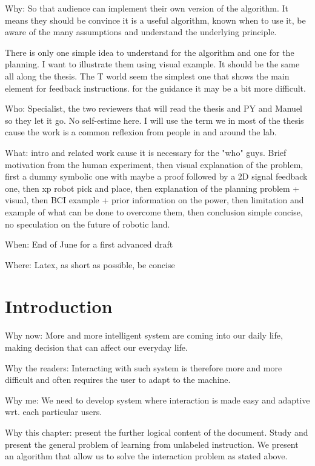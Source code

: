 
Why: So that audience can implement their own version of the algorithm. It means they should be convince it is a useful algorithm, known when to use it, be aware of the many assumptions and understand the underlying principle. 

There is only one simple idea to understand for the algorithm and one for the planning. I want to illustrate them using visual example. It should be the same all along the thesis. The T world seem the simplest one that shows the main element for feedback instructions. for the guidance it may be a bit more difficult.

Who: Specialist, the two reviewers that will read the thesis and PY and Manuel so they let it go. No self-estime here. I will use the term we in most of the thesis cause the work is a common reflexion from people in and around the lab.

What: intro and related work cause it is necessary for the "who" guys. Brief motivation from the human experiment, then visual explanation of the problem, first a dummy symbolic one with maybe a proof followed by a 2D signal feedback one, then xp robot pick and place, then explanation of the planning problem + visual, then BCI example + prior information on the power, then limitation and example of what can be done to overcome them, then conclusion simple concise, no speculation on the future of robotic land.

When: End of June for a first advanced draft

Where: Latex, as short as possible, be concise

\chapter{Introduction}
\minitoc

Why now: More and more intelligent system are coming into our daily life, making decision that can affect our everyday life. 

Why the readers: Interacting with such system is therefore more and more difficult and often requires the user to adapt to the machine.

Why me: We need to develop system where interaction is made easy and adaptive wrt. each particular users. 

Why this chapter: present the further logical content of the document. Study and present the general problem of learning from unlabeled instruction. We present an algorithm that allow us to solve the interaction problem as stated above.

